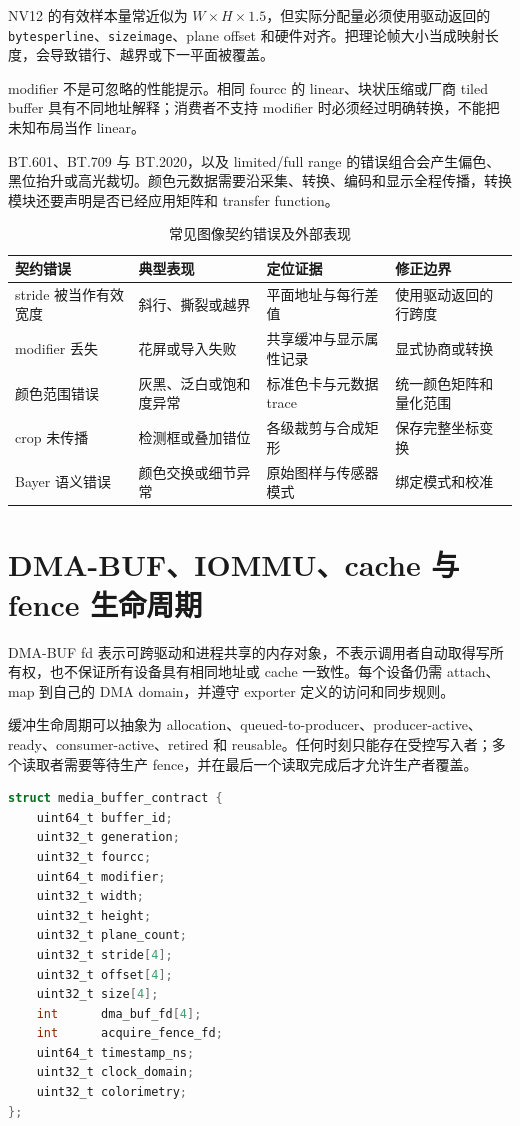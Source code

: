 NV12 的有效样本量常近似为 $W\times H\times1.5$，但实际分配量必须使用驱动返回的 \texttt{bytesperline}、\texttt{sizeimage}、plane offset 和硬件对齐。把理论帧大小当成映射长度，会导致错行、越界或下一平面被覆盖。

modifier 不是可忽略的性能提示。相同 fourcc 的 linear、块状压缩或厂商 tiled buffer 具有不同地址解释；消费者不支持 modifier 时必须经过明确转换，不能把未知布局当作 linear。

BT.601、BT.709 与 BT.2020，以及 limited/full range 的错误组合会产生偏色、黑位抬升或高光裁切。颜色元数据需要沿采集、转换、编码和显示全程传播，转换模块还要声明是否已经应用矩阵和 transfer function。

\begin{table}[H]
  \centering
  \caption{常见图像契约错误及外部表现}
  \begin{tabular}{p{31mm}p{39mm}p{41mm}p{27mm}}
    \hline
    契约错误 & 典型表现 & 定位证据 & 修正边界 \\
    \hline
    stride 被当作有效宽度 & 斜行、撕裂或越界 & 平面地址与每行差值 & 使用驱动返回的行跨度 \\
    modifier 丢失 & 花屏或导入失败 & 共享缓冲与显示属性记录 & 显式协商或转换 \\
    颜色范围错误 & 灰黑、泛白或饱和度异常 & 标准色卡与元数据 trace & 统一颜色矩阵和量化范围 \\
    crop 未传播 & 检测框或叠加错位 & 各级裁剪与合成矩形 & 保存完整坐标变换 \\
    Bayer 语义错误 & 颜色交换或细节异常 & 原始图样与传感器模式 & 绑定模式和校准 \\
    \hline
  \end{tabular}
\end{table}

\section{DMA-BUF、IOMMU、cache 与 fence 生命周期}

DMA-BUF fd 表示可跨驱动和进程共享的内存对象，不表示调用者自动取得写所有权，也不保证所有设备具有相同地址或 cache 一致性。每个设备仍需 attach、map 到自己的 DMA domain，并遵守 exporter 定义的访问和同步规则\cite{linux-dma-buf}。

缓冲生命周期可以抽象为 allocation、queued-to-producer、producer-active、ready、consumer-active、retired 和 reusable。任何时刻只能存在受控写入者；多个读取者需要等待生产 fence，并在最后一个读取完成后才允许生产者覆盖。

\noindent\begin{minipage}{\textwidth}
\begin{lstlisting}[language=C,caption={跨组件媒体缓冲区契约的逻辑字段}]
struct media_buffer_contract {
    uint64_t buffer_id;
    uint32_t generation;
    uint32_t fourcc;
    uint64_t modifier;
    uint32_t width;
    uint32_t height;
    uint32_t plane_count;
    uint32_t stride[4];
    uint32_t offset[4];
    uint32_t size[4];
    int      dma_buf_fd[4];
    int      acquire_fence_fd;
    uint64_t timestamp_ns;
    uint32_t clock_domain;
    uint32_t colorimetry;
};
\end{lstlisting}
\end{minipage}

